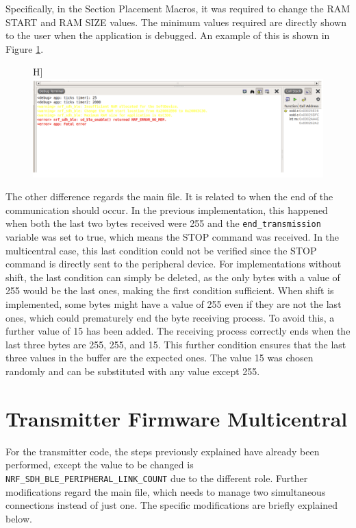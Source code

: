 \documentclass{Configuration_Files/PoliMi3i_thesis}
\begin{document}
Specifically, in the Section Placement Macros, it was required to change the RAM START and RAM SIZE values. The minimum values required are directly shown to the user when the application is debugged. An example of this is shown in Figure \ref{fig:memory_allocation_error}.

\begin{figure}H]
    \centering
    \includegraphics[scale=0.3]{Multicentral/4.png}
    \label{fig:memory_allocation_error}
\end{figure}

The other difference regards the main file. It is related to when the end of the communication should occur. In the previous implementation, this happened when both the last two bytes received were 255 and the \texttt{end\_transmission} variable was set to true, which means the STOP command was received. In the multicentral case, this last condition could not be verified since the STOP command is directly sent to the peripheral device. For implementations without shift, the last condition can simply be deleted, as the only bytes with a value of 255 would be the last ones, making the first condition sufficient. When shift is implemented, some bytes might have a value of 255 even if they are not the last ones, which could prematurely end the byte receiving process. To avoid this, a further value of 15 has been added. The receiving process correctly ends when the last three bytes are 255, 255, and 15. This further condition ensures that the last three values in the buffer are the expected ones. The value 15 was chosen randomly and can be substituted with any value except 255.

\section{Transmitter Firmware Multicentral}
For the transmitter code, the steps previously explained have already been performed, except the value to be changed is \texttt{NRF\_SDH\_BLE\_PERIPHERAL\_LINK\_COUNT} due to the different role. Further modifications regard the main file, which needs to manage two simultaneous connections instead of just one. The specific modifications are briefly explained below.
\end{document}
